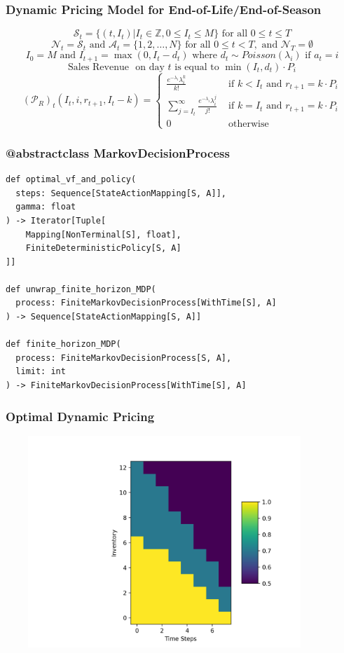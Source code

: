 \documentclass[handout]{beamer}
\begin{document}
\begin{frame}
\frametitle{Dynamic Pricing Model for End-of-Life/End-of-Season}
\pause
$$\mathcal{S}_t = \{(t, I_t) | I_t \in \mathbb{Z}, 0 \leq I_t \leq M\} \text{ for all } 0 \leq t \leq T$$
\pause
$$\mathcal{N}_t = \mathcal{S}_t \text{ and } \mathcal{A}_t = \{1, 2, \ldots, N\} \text{ for all } 0 \leq t < T, \text{ and } \mathcal{N}_T =\emptyset$$
\pause
$$I_0 = M \text{ and } I_{t+1} = \max(0, I_t - d_t) \text{ where } d_t \sim Poisson(\lambda_i) \text{ if } a_t = i$$
\pause
$$\text{Sales Revenue } \text{ on day } t \text{ is equal to } \min(I_t, d_t) \cdot P_i$$
\pause
$$
 (\mathcal{P}_R)_t(I_t, i, r_{t+1}, I_t - k) =
 \begin{cases}
 \frac {e^{-\lambda_i} \lambda_i^{k}} {k!} & \text{ if } k < I_t \text{ and } r_{t+1} = k \cdot P_i\\
 \sum_{j=I_t}^{\infty} \frac {e^{-\lambda_i} \lambda_i^{j}} {j!} & \text{ if } k = I_t \text{ and } r_{t+1} = k \cdot P_i\\
 0 & \text{ otherwise }
 \end{cases}
 $$
\end{frame}

\begin{frame}[fragile]
\frametitle{@abstractclass MarkovDecisionProcess}
\pause
\begin{lstlisting}
def optimal_vf_and_policy(
  steps: Sequence[StateActionMapping[S, A]],
  gamma: float
) -> Iterator[Tuple[
    Mapping[NonTerminal[S], float],
    FiniteDeterministicPolicy[S, A]
]]

def unwrap_finite_horizon_MDP(
  process: FiniteMarkovDecisionProcess[WithTime[S], A]
) -> Sequence[StateActionMapping[S, A]]

def finite_horizon_MDP(
  process: FiniteMarkovDecisionProcess[S, A],
  limit: int
) -> FiniteMarkovDecisionProcess[WithTime[S], A]
\end{lstlisting}
\end{frame}

\begin{frame}
\frametitle{Optimal Dynamic Pricing}
\includegraphics[width=12cm, height=8cm]{dynamic_pricing.png}
\end{frame}
\end{document}
